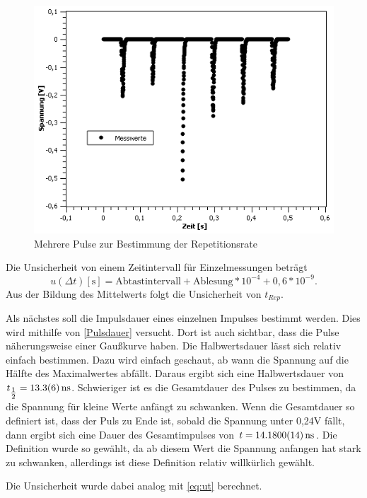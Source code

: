 \documentclass[
	a4paper,
	12pt,
	pagesize,
	ngerman
]{scrartcl}
\begin{document}
\begin{figure}[h!]
	\centering
	\includegraphics[scale=0.7]{Rep.png}
	\caption{Mehrere Pulse zur Bestimmung der Repetitionsrate}
	\label{Rep}
\end{figure}

Die Unsicherheit von einem Zeitintervall für Einzelmessungen beträgt 
\begin{equation}
u(\Delta t)[\text{s}] = \text{Abtastintervall} + \text{Ablesung} *10^{-4} +0,6*10^{-9}.
\label{eq:ut}
\end{equation}
Aus der Bildung des Mittelwerts folgt die Unsicherheit von $t_{Rep}$.


Als nächstes soll die Impulsdauer eines einzelnen Impulses bestimmt werden. Dies wird mithilfe von \cref{Pulsdauer} versucht. Dort ist auch sichtbar, dass die Pulse näherungsweise einer Gaußkurve haben. Die Halbwertsdauer lässt sich relativ einfach bestimmen. Dazu wird einfach geschaut, ab wann die Spannung auf die Hälfte des Maximalwertes abfällt. Daraus ergibt sich eine Halbwertsdauer von $t_{\tfrac{1}{2}} = \SI{13,3 \pm 0,6}{ns}$. Schwieriger ist es die Gesamtdauer des Pulses zu bestimmen, da die Spannung für kleine Werte anfängt zu schwanken. Wenn die Gesamtdauer so definiert ist, dass der Puls zu Ende ist, sobald die Spannung unter 0,24V fällt, dann ergibt sich eine Dauer des Gesamtimpulses von $t = \SI{14,180 \pm 0,0014}{ns}$. Die Definition wurde so gewählt, da ab diesem Wert die Spannung anfangen hat stark zu schwanken, allerdings ist diese Definition relativ willkürlich gewählt. 

Die Unsicherheit wurde dabei analog mit \cref{eq:ut} berechnet.
\end{document}
